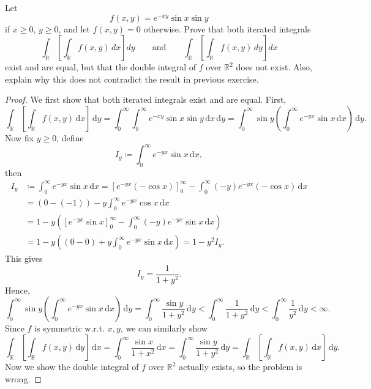 \begin{problem}
    Let
    \[
    f(x,y)=e^{-xy}\sin x\sin y
    \]
    if \(x\ge 0\), \(y\ge 0\), and let \(f(x,y)=0\) otherwise. Prove that both
    iterated integrals
    \[
    \int_{\mathbb R}
    \left[
    \int_{\mathbb R} f(x,y)\,dx
    \right]dy
    \qquad\text{and}\qquad
    \int_{\mathbb R}
    \left[
    \int_{\mathbb R} f(x,y)\,dy
    \right]dx
    \]
    exist and are equal, but that the double integral of \(f\) over \(\mathbb R^2\)
    does not exist. Also, explain why this does not contradict the result in previous exercise.
\end{problem}
\begin{proof}
    We first show that both iterated integrals exist and are equal. First, 
    \[
        \int _{\mathbb{R} } \left[ \int _{\mathbb{R} } f(x, y) \, \mathrm{d} x  \right] \, \mathrm{d} y = \int _0^{\infty} \int _0^{\infty} e^{-xy} \sin x \sin y \, \mathrm{d} x \, \mathrm{d} y = \int _0^{\infty} \sin y \left( \int _0^{\infty} e^{-yx} \sin x \, \mathrm{d} x  \right) \, \mathrm{d} y.      
    \]
    Now fix \(y \ge 0\), define 
    \[
        I_y \coloneqq \int _0^{\infty} e^{-yx} \sin x \, \mathrm{d} x, 
    \] 
    then 
    \begin{align*}
        I_y &\coloneqq \int _0^{\infty} e^{-yx} \sin x \, \mathrm{d} x = \left[ e^{-yx} (-\cos x) \right]_0^{\infty } - \int _0^{\infty} (-y) e^{-yx} (-\cos x) \, \mathrm{d} x \\
        &= (0 - (-1)) - y \int _0^{\infty} e^{-yx} \cos x \, \mathrm{d} x \\
        &= 1 - y \left( \left[ e^{-yx} \sin x \right]_0^{\infty} - \int _0^{\infty} (-y) e^{-yx} \sin x \, \mathrm{d} x   \right) \\
        &= 1 - y \left( (0 - 0) + y \int _0^{\infty} e^{-yx} \sin x \, \mathrm{d} x  \right) = 1 - y^2 I_y.     
    \end{align*}
    This gives
    \[
        I_y = \frac{1}{1 + y^2}.
    \]
    Hence, 
    \[
        \int _0^{\infty} \sin y \left( \int _0^{\infty} e^{-yx} \sin x \, \mathrm{d} x  \right) \, \mathrm{d} y = \int _0^{\infty} \frac{\sin y}{1 + y^2} \, \mathrm{d} y < \int _0^{\infty} \frac{1}{1 + y^2} \, \mathrm{d} y < \int _0^{\infty} \frac{1}{y^2} \, \mathrm{d} y < \infty.      
    \]
    Since \(f\) is symmetric w.r.t. \(x, y\), we can similarly show 
    \[
        \int _{\mathbb{R} } \left[ \int _{\mathbb{R} } f(x, y) \, \mathrm{d} y  \right] \, \mathrm{d} x = \int _0^{\infty} \frac{\sin x}{1 + x^2} \, \mathrm{d} x = \int _0^{\infty} \frac{\sin y}{1 + y^2} \, \mathrm{d} y = \int _{\mathbb{R} } \left[ \int _{\mathbb{R} } f(x, y) \, \mathrm{d} x  \right] \, \mathrm{d} y. 
    \]  
    Now we show the double integral of \(f\) over \(\mathbb{R} ^2\) actually exists, so the problem is wrong. 
    

\end{proof}
